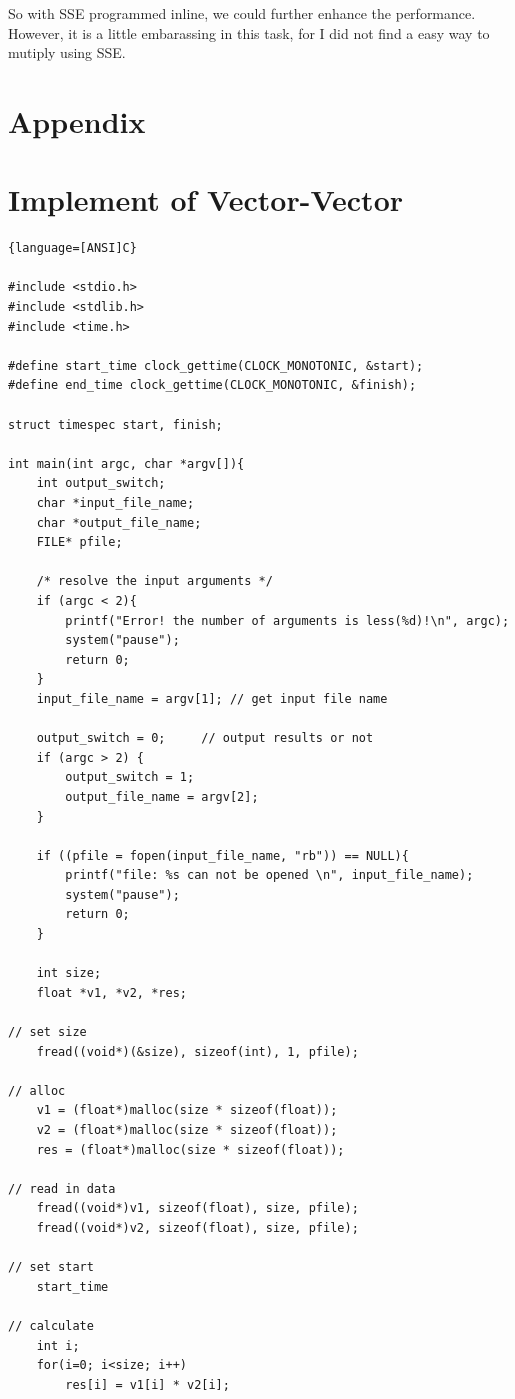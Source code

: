 \documentclass[a4paper]{article}   %
\begin{document}
\begin{CJK}{UTF8}{gbsn}
\begin{spacing}{1.2}
So with SSE programmed inline, we could further enhance the performance. However, it is a little embarassing in this task, for I did not find a easy way to mutiply using SSE. 




\appendix
\section*{Appendix}
\section{Implement of Vector-Vector}
\begin{lstlisting}{language=[ANSI]C}

#include <stdio.h>
#include <stdlib.h>
#include <time.h>

#define start_time clock_gettime(CLOCK_MONOTONIC, &start);
#define end_time clock_gettime(CLOCK_MONOTONIC, &finish);

struct timespec start, finish;
	
int main(int argc, char *argv[]){
    int output_switch; 
    char *input_file_name;
    char *output_file_name;
    FILE* pfile;
    
    /* resolve the input arguments */
    if (argc < 2){
        printf("Error! the number of arguments is less(%d)!\n", argc);
        system("pause");
        return 0;
    }
    input_file_name = argv[1]; // get input file name

    output_switch = 0;     // output results or not 
    if (argc > 2) {       
        output_switch = 1;
        output_file_name = argv[2];
    }

    if ((pfile = fopen(input_file_name, "rb")) == NULL){
        printf("file: %s can not be opened \n", input_file_name);
        system("pause");
        return 0;
    }

    int size;
    float *v1, *v2, *res;

// set size
	fread((void*)(&size), sizeof(int), 1, pfile);

// alloc
	v1 = (float*)malloc(size * sizeof(float));
	v2 = (float*)malloc(size * sizeof(float));
	res = (float*)malloc(size * sizeof(float));

// read in data
	fread((void*)v1, sizeof(float), size, pfile);
	fread((void*)v2, sizeof(float), size, pfile);

// set start
	start_time

// calculate
	int i;
	for(i=0; i<size; i++)
		res[i] = v1[i] * v2[i];	


\end{lstlisting}
\end{spacing}
\end{CJK}
\end{document}
